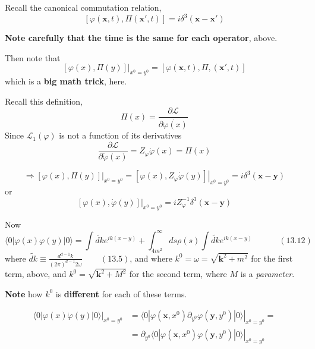 \documentclass[twoside]{amsart}
\begin{document}
Recall the canonical commutation relation, 
\[
[ \varphi(\mathbf{x}, t), \Pi(\mathbf{x}', t) ] = i \delta^3(\mathbf{x} - \mathbf{x}')
\]

\textbf{Note carefully that the time is the same for each operator}, above.  

Then note that 
\[
\left. [ \varphi(x), \Pi(y)] \right|_{x^0 = y^0} =  [ \varphi(\mathbf{x},t), \Pi,(\mathbf{x}',t) ]
\]
which is a \textbf{big math trick}, here.  

Recall this definition,
\[
\Pi(x) = \frac{  \partial \mathcal{L}}{ \partial \dot{\varphi(x) }}
\]
Since $\mathcal{L}_1(\varphi)$ is not a function of its derivatives
\[
\frac{ \partial \mathcal{L}}{ \partial \dot{\varphi}(x)} = Z_{\varphi} \dot{\varphi}(x) = \Pi(x)
\]

\[
\Longrightarrow  \left. [ \varphi(x) , \Pi(y) ] \right|_{x^0 = y^0 } = \left. [ \varphi(x), Z_{\varphi} \dot{\varphi}(y) ] \right|_{x^0 = y^0 } = i \delta^3(\mathbf{x} -  \mathbf{y} )
\]
or  
\[
\left. [ \varphi(x), \dot{\varphi}(y) ] \right|_{x^0 = y^0 } = i Z_{\varphi}^{-1} \delta^3(\mathbf{x}- \mathbf{y} )
\]

Now
\[
\langle 0 | \varphi(x) \varphi(y) | 0 \rangle = \int \widetilde{dk} e^{ik(x-y) } + \int_{4m^2}^{\infty} ds \rho(s) \int \widetilde{dk} e^{ik(x-y)}  \quad \quad \quad \, (13.12)
\]
where $\widetilde{dk} \equiv \frac{ d^{d-1} k }{ (2\pi)^{d-1} 2 \omega } \quad \quad \, (13.5)$, and where $k^0 = \omega = \sqrt{ \mathbf{k}^2 + m^2 }$ for the first term, above, and $k^0 = \sqrt{ \mathbf{k}^2 + M^2}$ for the second term, where $M$ is a \emph{parameter}.  

\textbf{ Note} how $k^0$ is \textbf{different} for each of these terms.  

\[
\begin{aligned}
  \left. \langle 0 | \varphi(x) \dot{\varphi}(y) |0  \rangle \right|_{x^0 = y^0} & = \left. \langle 0 | \varphi( \mathbf{x}, x^0 ) \partial_{y^0} \varphi(\mathbf{y}, y^0 )|0 \rangle \right|_{x^0 = y^0 } =  \\ 
  & = \left. \partial_{y^0} \langle  0 | \varphi(\mathbf{x}, x^0 ) \varphi(\mathbf{y}, y^0) | 0 \rangle \right|_{x^0 = y^0 }
\end{aligned}
\]
\end{document}
